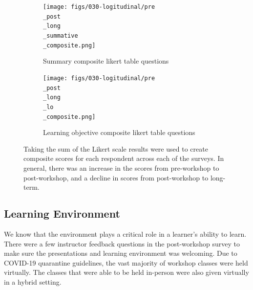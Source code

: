 \documentclass[030-workshop.tex]{subfiles}
\begin{document}
            \begin{figure}[htb]
                \centering
                \begin{subfigure}[h]{0.45\textwidth}
                    \centering
                    \texttt{[image: figs/030-logitudinal/pre\\\_post\\\_long\\\_summative\\\_composite.png]}
                    \caption[Pre-Post-workshop and Long-term Survey for summary likert composite]
                    {Summary composite likert table questions}
                    \label{sfig:pre-post-long-composite-summary}
                \end{subfigure}
                \hfill
                \begin{subfigure}[h]{0.45\textwidth}
                    \centering
                    \texttt{[image: figs/030-logitudinal/pre\\\_post\\\_long\\\_lo\\\_composite.png]}
                    \caption[Pre-Post-workshop and Long-term Survey for learning objective likert composite]
                    {Learning objective composite likert table questions}
                    \label{sfig:pre-post-long-composite-lo}
                \end{subfigure}
                \caption[Summary table and learning objective composite likert questions (pre, post, long-term)]
                {Taking the sum of the Likert scale results were used to create composite scores for each respondent
                 across each of the surveys.
                 In general, there was an increase in the scores from pre-workshop to post-workshop,
                 and a decline in scores from post-workshop to long-term.
                }
                \label{fig:pre-post-long-composite-summary-lo}
            \end{figure}

    \subsection{Learning Environment}

        We know that the environment plays a critical role in a learner's ability to learn.
        There were a few instructor feedback questions in the post-workshop survey to make sure
        the presentations and learning environment was welcoming.
        Due to COVID-19 quarantine guidelines,
        the vast majority of workshop classes were held virtually.
        The classes that were able to be held in-person were also given virtually in a hybrid setting.
\end{document}
